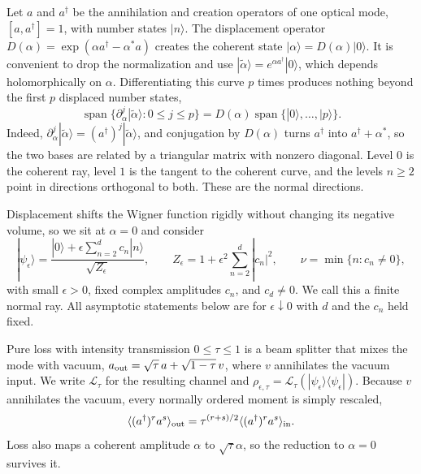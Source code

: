 \documentclass[11pt,a4paper]{article}
\newcommand{\ket}[1]{|#1\rangle}
\newcommand{\bra}[1]{\langle#1|}
\newcommand{\ev}[1]{\langle#1\rangle}
\newcommand{\loss}{\mathcal L}
\begin{document}
Let $a$ and $a^\dagger$ be the annihilation and creation operators of one optical mode, $[a,a^\dagger]=1$, with number states $\ket n$. The displacement operator $D(\alpha)=\exp(\alpha a^\dagger-\alpha^*a)$ creates the coherent state $\ket\alpha=D(\alpha)\ket0$. It is convenient to drop the normalization and use $\ket{\widetilde\alpha}=e^{\alpha a^\dagger}\ket0$, which depends holomorphically on $\alpha$. Differentiating this curve $p$ times produces nothing beyond the first $p$ displaced number states,
\begin{equation}
 \operatorname{span}\{\partial_\alpha^j\ket{\widetilde\alpha}:0\le j\le p\}
 =D(\alpha)\operatorname{span}\{\ket0,\ldots,\ket p\}.
 \label{eq:flag}
\end{equation}
Indeed, $\partial_\alpha^j\ket{\widetilde\alpha}=(a^\dagger)^j\ket{\widetilde\alpha}$, and conjugation by $D(\alpha)$ turns $a^\dagger$ into $a^\dagger+\alpha^*$, so the two bases are related by a triangular matrix with nonzero diagonal. Level $0$ is the coherent ray, level $1$ is the tangent to the coherent curve, and the levels $n\ge2$ point in directions orthogonal to both. These are the normal directions.

Displacement shifts the Wigner function rigidly without changing its negative volume, so we sit at $\alpha=0$ and consider
\begin{equation}
 \ket{\psi_\epsilon}
 =\frac{\ket0+\epsilon\sum_{n=2}^d c_n\ket n}{\sqrt{Z_\epsilon}},
 \qquad Z_\epsilon=1+\epsilon^2\sum_{n=2}^d|c_n|^2,
 \qquad \nu=\min\{n:c_n\ne0\},
 \label{eq:ray}
\end{equation}
with small $\epsilon>0$, fixed complex amplitudes $c_n$, and $c_d\ne0$. We call this a finite normal ray. All asymptotic statements below are for $\epsilon\downarrow0$ with $d$ and the $c_n$ held fixed.

Pure loss with intensity transmission $0\le\tau\le1$ is a beam splitter that mixes the mode with vacuum, $a_{\rm out}=\sqrt\tau\,a+\sqrt{1-\tau}\,v$, where $v$ annihilates the vacuum input. We write $\loss_\tau$ for the resulting channel and $\rho_{\epsilon,\tau}=\loss_\tau(\ket{\psi_\epsilon}\bra{\psi_\epsilon})$. Because $v$ annihilates the vacuum, every normally ordered moment is simply rescaled,
\begin{equation}
 \ev{(a^\dagger)^r a^s}_{\rm out}
 =\tau^{(r+s)/2}\ev{(a^\dagger)^r a^s}_{\rm in}.
 \label{eq:loss}
\end{equation}
Loss also maps a coherent amplitude $\alpha$ to $\sqrt\tau\alpha$, so the reduction to $\alpha=0$ survives it.
\end{document}
